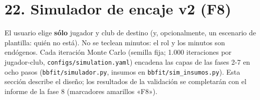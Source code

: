 \documentclass[10pt,a4paper]{article}
\begin{document}
\section*{22. Simulador de encaje v2 (F8)}
El usuario elige \textbf{sólo} jugador y club de destino (y, opcionalmente, un escenario de plantilla: quién no está). No se teclean minutos: el rol y los minutos son endógenos. Cada iteración Monte Carlo (semilla fija; 1.000 iteraciones por jugador-club, \texttt{configs/\allowbreak{}simulation.yaml}) encadena las capas de las fases 2-7 en ocho pasos (\texttt{bbfit/\allowbreak{}simulador.py}, insumos en \texttt{bbfit/\allowbreak{}sim\_insumos.py}). Esta sección describe el diseño; los resultados de la validación se completarán con el informe de la fase 8 (marcadores amarillos «F8»).
\end{document}
